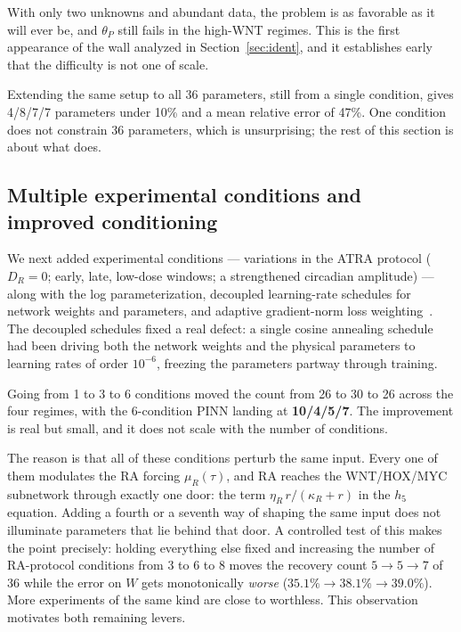 \documentclass[11pt]{article}
\newcommand{\thP}{\theta_P}
\begin{document}
With only two unknowns and abundant data, the problem is as favorable as it
will ever be, and $\thP$ still fails in the high-WNT regimes. This is the first
appearance of the wall analyzed in Section~\ref{sec:ident}, and it establishes
early that the difficulty is not one of scale.

Extending the same setup to all 36 parameters, still from a single condition,
gives 4/8/7/7 parameters under 10\% and a mean relative error of 47\%. One
condition does not constrain 36 parameters, which is unsurprising; the rest of
this section is about what does.

\subsection{Multiple experimental conditions and improved conditioning}

We next added experimental conditions --- variations in the ATRA protocol
($D_R = 0$; early, late, low-dose windows; a strengthened circadian amplitude)
--- along with the log parameterization, decoupled learning-rate schedules for
network weights and parameters, and adaptive gradient-norm loss
weighting~\citep{wang2021gradient,maddu2022dirichlet}. The decoupled schedules
fixed a real defect: a single cosine annealing schedule had been driving both
the network weights and the physical parameters to learning rates of order
$10^{-6}$, freezing the parameters partway through training.

Going from 1 to 3 to 6 conditions moved the count from 26 to 30 to 26 across
the four regimes, with the 6-condition PINN landing at \textbf{10/4/5/7}. The
improvement is real but small, and it does not scale with the number of
conditions.

The reason is that all of these conditions perturb the same input. Every one of
them modulates the RA forcing $\mu_R(\tau)$, and RA reaches the WNT/HOX/MYC
subnetwork through exactly one door: the term
$\eta_R\,r/(\kappa_R + r)$ in the $h_5$ equation. Adding a fourth or a
seventh way of shaping the same input does not illuminate parameters that lie
behind that door. A controlled test of this makes the point precisely: holding
everything else fixed and increasing the number of RA-protocol conditions from
3 to 6 to 8 moves the recovery count $5 \to 5 \to 7$ of 36 while the error on
$W$ gets monotonically \emph{worse} ($35.1\% \to 38.1\% \to 39.0\%$). More
experiments of the same kind are close to worthless. This observation motivates
both remaining levers.
\end{document}
